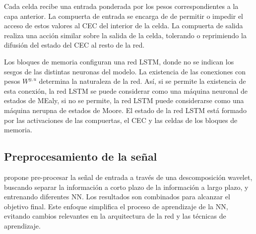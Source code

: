 Cada celda recibe una entrada ponderada por los pesos correspondientes a la capa anterior. La compuerta de entrada se encarga de de permitir o impedir el acceso de estos valores al CEC del interior de la celda. La compuerta de salida realiza una acción similar sobre la salida de la celda, tolerando o reprimiendo la difusión del estado del CEC al resto de la red.

Los bloques de memoria configuran una red LSTM, donde no se indican los sesgos de las distintas neuronas del modelo. La existencia de las conexiones con pesos $W^{y, u}$  determina la naturaleza de la red. Así, si se permite la existencia de esta conexión, la red LSTM se puede considerar como una máquina neuronal de estados de MEaly, si no se permite, la red LSTM puede considerarse como una máquina nerupna de estados de Moore. El estado de la red LSTM está formado por las activaciones de las compuertas, el CEC y las celdas de los bloques de memoria.





\subsection{Preprocesamiento de la señal}
 propone pre-procesar la señal de entrada a través de una descomposición wavelet, buscando separar la información a corto plazo de la información a largo plazo, y entrenando diferentes NN. Los resultados son combinados para alcanzar el objetivo final. Este enfoque simplifica el proceso de aprendizaje de la NN, evitando cambios relevantes en la arquitectura de la red y las técnicas de aprendizaje.
